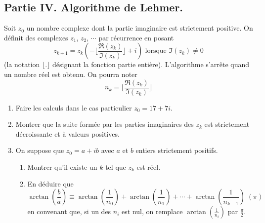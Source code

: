 \subsection*{Partie IV. Algorithme de Lehmer.}
Soit $z_0$ un nombre complexe dont la partie imaginaire est strictement positive. On définit des complexes $z_1$, $z_2$, $\cdots$ par récurrence en posant
\begin{displaymath}
 z_{k+1}=z_k(-\lfloor\frac{\Re (z_k)}{\Im (z_k)}\rfloor + i) \text{ lorsque } \Im (z_k) \neq 0
\end{displaymath}
(la notation $\lfloor . \rfloor$ désignant la fonction partie entière). L'algorithme s'arrête quand un nombre réel est obtenu. On pourra noter
\[n_k = \lfloor \frac{\Re (z_k)}{\Im (z_k)}\rfloor \]
\begin{enumerate}
\item Faire les calculs dans le cas particulier $z_0=17+7i$.
\item Montrer que la suite formée par les parties imaginaires des $z_k$ est strictement décroissante et à valeurs positives.
\item On suppose que $z_0=a+ib$ avec $a$ et $b$ entiers strictement positifs.
\begin{enumerate}
\item Montrer qu'il existe un $k$ tel que $z_k$ est réel.
\item En déduire que
\[\arctan(\frac{b}{a}) \equiv \arctan(\frac{1}{n_0})+\arctan(\frac{1}{n_1}) + \cdots + \arctan(\frac{1}{n_{k-1}}) \; (\pi)\]
en convenant que, si un des $n_i$ est nul, on remplace $\arctan(\frac{1}{n_i})$ par $\frac{\pi}{2}$.
\end{enumerate}
\end{enumerate}
